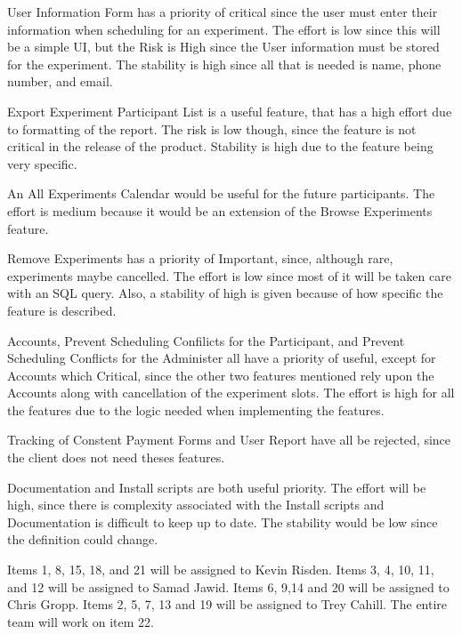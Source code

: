 User Information Form has a priority of critical since the user must enter their information when scheduling for an experiment.  The effort is low since this will be a simple UI, but the Risk is High since the User information must be stored for the experiment.  The stability is high since all that is needed is name, phone number, and email.  

Export Experiment Participant List is a useful feature, that has a high effort due to formatting of the report.  The risk is low though, since the feature is not critical in the release of the product.  Stability is high due to the feature being very specific.

An All Experiments Calendar would be useful for the future participants.  The effort is medium because it would be an extension of the Browse Experiments feature.

Remove Experiments has a priority of Important, since, although rare, experiments maybe cancelled. The effort is low since most of it will be taken care with an SQL query.  Also, a stability of high is given because of  how specific the feature is described.

Accounts, Prevent Scheduling Confilicts for the Participant, and Prevent Scheduling Conflicts for the Administer all have a priority of useful, except for Accounts which Critical, since the other two features mentioned rely upon the Accounts along with cancellation of the experiment slots.  The effort is high for all the features due to the logic needed when implementing the features.  

Tracking of Constent Payment Forms and User Report have all be rejected, since the client does not need theses features.

\clearpage
Documentation and Install scripts are both useful priority.  The effort will be high, since there is complexity associated with the Install scripts and Documentation is difficult to keep up to date.  The stability would be low since the definition could change.


Items 1, 8, 15, 18, and 21 will be assigned to Kevin Risden.  Items 3, 4, 10, 11, and 12 will be assigned to Samad Jawid.  Items 6, 9,14 and 20  will be assigned to Chris Gropp.  Items 2, 5, 7, 13 and 19 will be assigned to Trey Cahill.  The entire team will work on item 22.


